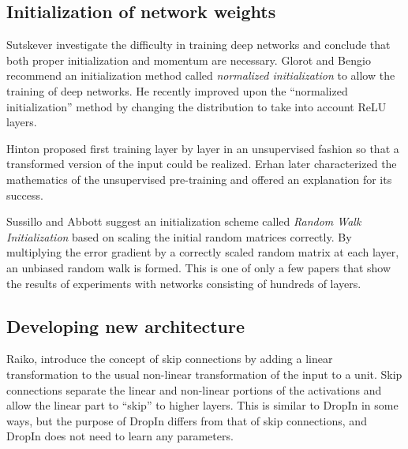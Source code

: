 \documentclass[10pt,twocolumn,letterpaper]{article}
\newcommand{\dropin}{DropIn }
\begin{document}
\subsection{Initialization of network weights}
Sutskever \etal \cite{sutskever2013importance} investigate the difficulty in training deep networks and conclude that both proper initialization and momentum are necessary.  Glorot and Bengio \cite{glorot2010understanding} recommend an initialization method called \textit{normalized initialization} to allow the training of deep networks.  
He \etal \cite{he2015delving} recently improved  upon the ``normalized initialization'' method by changing the distribution to take into account ReLU layers.  

Hinton \etal \cite{hinton2006fast} proposed first training layer by layer in an unsupervised fashion so that a transformed version of the input could be realized.  
Erhan  \cite{erhan2009difficulty} later characterized the mathematics of the unsupervised pre-training and offered an explanation for its success.   

Sussillo and Abbott \cite{sussillo2015random} suggest an initialization scheme called \textit{Random Walk Initialization} based on scaling the initial random matrices correctly.  
By multiplying the error gradient by a correctly scaled random matrix at each layer, an unbiased  random walk is formed.  
This is one of only a few papers that show the results of experiments with networks consisting of hundreds of layers.  

\subsection{Developing new architecture}

Raiko, \etal \cite{raiko2012deep} introduce the concept of skip connections by adding a linear transformation to the usual non-linear transformation of the input to a unit.  
Skip connections separate the linear and non-linear portions of the activations and allow the linear part to ``skip'' to higher layers.
This is similar to \dropin in some ways, but the purpose of \dropin differs from that of skip connections, and \dropin does not need to learn any parameters.
\end{document}
